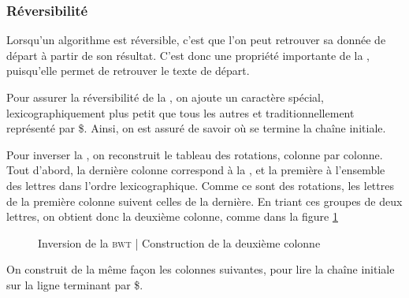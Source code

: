 \subsubsection{Réversibilité}
Lorsqu'un algorithme est réversible, c'est que l'on peut retrouver sa donnée de départ à partir de son résultat. C'est donc une propriété importante de la \bwt, puisqu'elle permet de retrouver le texte de départ.

Pour assurer la réversibilité de la \bwt, on ajoute un caractère spécial, lexicographiquement plus petit que tous les autres et traditionnellement représenté par \$. Ainsi, on est assuré de savoir où se termine la chaîne initiale.

Pour inverser la \bwt, on reconstruit le tableau des rotations, colonne par colonne.
Tout d'abord, la dernière colonne correspond à la \bwt, et la première à l'ensemble des lettres dans l'ordre lexicographique. Comme ce sont des rotations, les lettres de la première colonne suivent celles de la dernière. En triant ces groupes de deux lettres, on obtient donc la deuxième colonne, comme dans la figure \ref{unbwt}

\begin{figure}[h!]
\caption{Inversion de la \textsc{bwt} | Construction de la deuxième colonne}
\label{unbwt} 
\end{figure}

On construit de la même façon les colonnes suivantes, pour lire la chaîne initiale sur la ligne terminant par \$.

